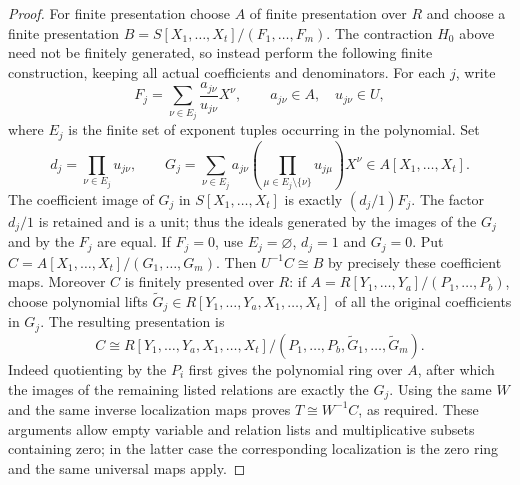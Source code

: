 \begin{proof}
For finite presentation choose $A$ of finite presentation over
$R$ and choose a finite presentation
$B=S[X_1,\ldots,X_t]/(F_1,\ldots,F_m)$.
The contraction $H_0$ above need not be finitely generated,
so instead perform the following finite construction, keeping
all actual coefficients and denominators.
For each $j$, write
$$
F_j=\sum_{\nu\in E_j}\frac{a_{j\nu}}{u_{j\nu}}X^\nu,
\qquad a_{j\nu}\in A,\quad u_{j\nu}\in U,
$$
where $E_j$ is the finite set of exponent tuples occurring in
the polynomial. Set
$$
d_j=\prod_{\nu\in E_j}u_{j\nu},\qquad
G_j=\sum_{\nu\in E_j}
a_{j\nu}\left(\prod_{\mu\in E_j\setminus\{\nu\}}
u_{j\mu}\right)X^\nu\in A[X_1,\ldots,X_t].
$$
The coefficient image of $G_j$ in $S[X_1,\ldots,X_t]$ is
exactly $(d_j/1)F_j$. The factor $d_j/1$ is retained and is
a unit; thus the ideals generated by the images of the $G_j$
and by the $F_j$ are equal. If $F_j=0$, use $E_j=\varnothing$,
$d_j=1$ and $G_j=0$.
Put $C=A[X_1,\ldots,X_t]/(G_1,\ldots,G_m)$.
Then $U^{-1}C\cong B$ by precisely these coefficient maps.
Moreover $C$ is finitely presented over $R$: if
$A=R[Y_1,\ldots,Y_a]/(P_1,\ldots,P_b)$, choose polynomial
lifts $\widetilde G_j\in R[Y_1,\ldots,Y_a,X_1,\ldots,X_t]$
of all the original coefficients in $G_j$.
The resulting presentation is
$$
C\cong R[Y_1,\ldots,Y_a,X_1,\ldots,X_t]
/(P_1,\ldots,P_b,\widetilde G_1,\ldots,\widetilde G_m).
$$
Indeed quotienting by the $P_i$ first gives the polynomial
ring over $A$, after which the images of the remaining listed
relations are exactly the $G_j$.
Using the same $W$ and the same inverse localization maps proves
$T\cong W^{-1}C$, as required. These arguments allow empty
variable and relation lists and multiplicative subsets containing
zero; in the latter case the corresponding localization is the
zero ring and the same universal maps apply.
\end{proof}